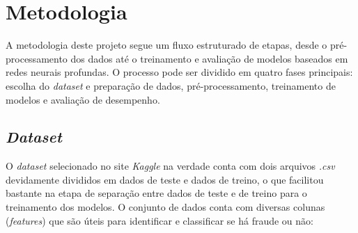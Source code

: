 \documentclass[conference]{IEEEtran}
\begin{document}
\section{Metodologia}

A metodologia deste projeto segue um fluxo estruturado de etapas, desde o pré-processamento dos dados até o treinamento e avaliação de modelos baseados em redes neurais profundas. O processo pode ser dividido em quatro fases principais: escolha do \textit{dataset} e preparação de dados, pré-processamento, treinamento de modelos e avaliação de desempenho.

\subsection{\textit{Dataset}}

O \textit{dataset} selecionado no site \textit{Kaggle} na verdade conta com dois arquivos \textit{.csv} devidamente divididos em dados de teste e dados de treino, o que facilitou bastante na etapa de separação entre dados de teste e de treino para o treinamento dos modelos. O conjunto de dados conta com diversas colunas (\textit{features}) que são úteis para identificar e classificar se há fraude ou não:
\end{document}
